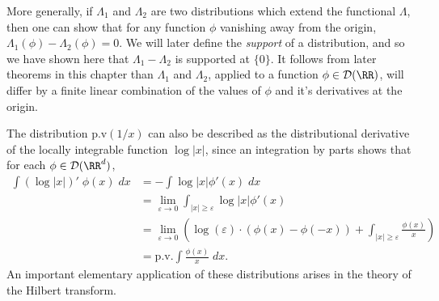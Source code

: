 \begin{example}
    More generally, if $\Lambda_1$ and $\Lambda_2$ are two distributions which extend the functional $\Lambda$, then one can show that for any function $\phi$ vanishing away from the origin, $\Lambda_1(\phi) - \Lambda_2(\phi) = 0$. We will later define the \emph{support} of a distribution, and so we have shown here that $\Lambda_1 - \Lambda_2$ is supported at $\{ 0 \}$. It follows from later theorems in this chapter than $\Lambda_1$ and $\Lambda_2$, applied to a function $\phi \in \mathcal{D}(\RR)$, will differ by a finite linear combination of the values of $\phi$ and it's derivatives at the origin.

    The distribution $\text{p.v}(1/x)$ can also be described as the distributional derivative of the locally integrable function $\log |x|$, since an integration by parts shows that for each $\phi \in \mathcal{D}(\RR^d)$,
    \begin{align*}
        \int (\log |x|)'\; \phi(x)\; dx &= - \int \log |x| \phi'(x)\; dx\\
        &= \lim_{\varepsilon \to 0} \int_{|x| \geq \varepsilon} \log |x| \phi'(x)\\
        &= \lim_{\varepsilon \to 0} \left( \log(\varepsilon) \cdot \left( \phi(x) - \phi(-x) \right) + \int_{|x| \geq \varepsilon} \frac{\phi(x)}{x} \right)\\
        &= \text{p.v.} \int \frac{\phi(x)}{x}\; dx.
    \end{align*}
    An important elementary application of these distributions arises in the theory of the Hilbert transform.
\end{example}

